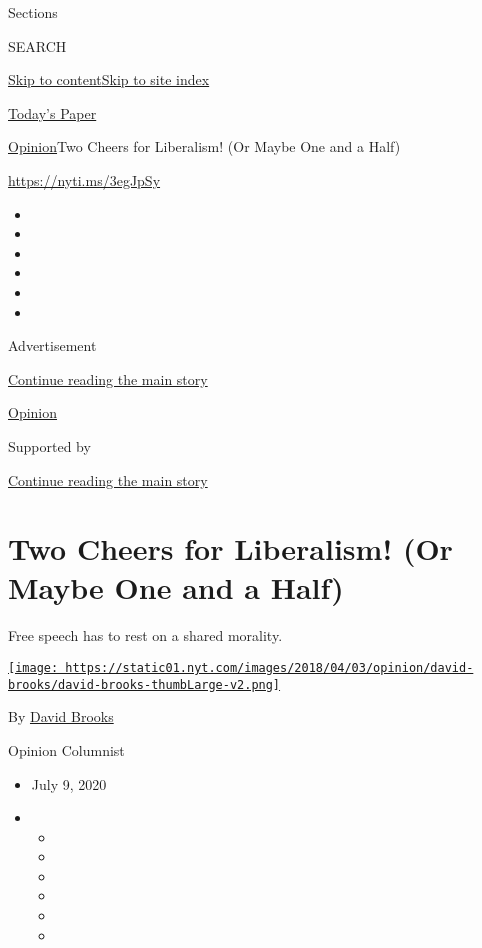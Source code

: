 Sections

SEARCH

\protect\hyperlink{site-content}{Skip to
content}\protect\hyperlink{site-index}{Skip to site index}

\href{https://myaccount.nytimes.com/auth/login?response_type=cookie\&client_id=vi}{}

\href{https://www.nytimes.com/section/todayspaper}{Today's Paper}

\href{/section/opinion}{Opinion}\textbar{}Two Cheers for Liberalism! (Or
Maybe One and a Half)

\href{https://nyti.ms/3egJpSy}{https://nyti.ms/3egJpSy}

\begin{itemize}
\item
\item
\item
\item
\item
\item
\end{itemize}

Advertisement

\protect\hyperlink{after-top}{Continue reading the main story}

\href{/section/opinion}{Opinion}

Supported by

\protect\hyperlink{after-sponsor}{Continue reading the main story}

\hypertarget{two-cheers-for-liberalism-or-maybe-one-and-a-half}{%
\section{Two Cheers for Liberalism! (Or Maybe One and a
Half)}\label{two-cheers-for-liberalism-or-maybe-one-and-a-half}}

Free speech has to rest on a shared morality.

\href{https://www.nytimes.com/by/david-brooks}{\texttt{[image: https://static01.nyt.com/images/2018/04/03/opinion/david-brooks/david-brooks-thumbLarge-v2.png]}}

By \href{https://www.nytimes.com/by/david-brooks}{David Brooks}

Opinion Columnist

\begin{itemize}
\item
  July 9, 2020
\item
  \begin{itemize}
  \item
  \item
  \item
  \item
  \item
  \item
  \end{itemize}
\end{itemize}

